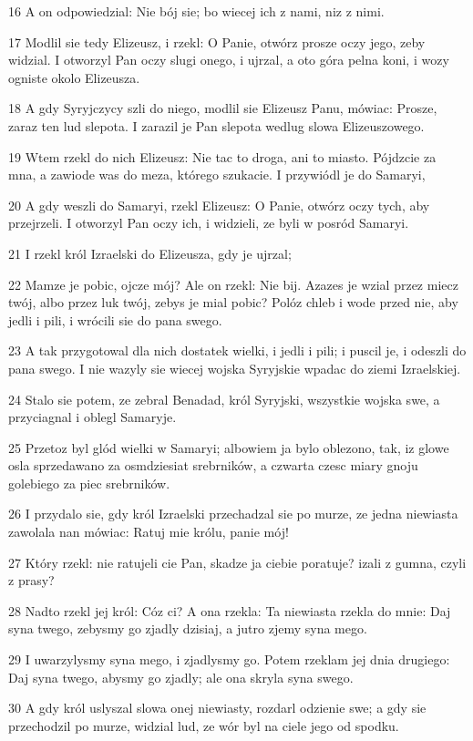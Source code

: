\par 16 A on odpowiedzial: Nie bój sie; bo wiecej ich z nami, niz z nimi.
\par 17 Modlil sie tedy Elizeusz, i rzekl: O Panie, otwórz prosze oczy jego, zeby widzial. I otworzyl Pan oczy slugi onego, i ujrzal, a oto góra pelna koni, i wozy ogniste okolo Elizeusza.
\par 18 A gdy Syryjczycy szli do niego, modlil sie Elizeusz Panu, mówiac: Prosze, zaraz ten lud slepota. I zarazil je Pan slepota wedlug slowa Elizeuszowego.
\par 19 Wtem rzekl do nich Elizeusz: Nie tac to droga, ani to miasto. Pójdzcie za mna, a zawiode was do meza, którego szukacie. I przywiódl je do Samaryi,
\par 20 A gdy weszli do Samaryi, rzekl Elizeusz: O Panie, otwórz oczy tych, aby przejrzeli. I otworzyl Pan oczy ich, i widzieli, ze byli w posród Samaryi.
\par 21 I rzekl król Izraelski do Elizeusza, gdy je ujrzal;
\par 22 Mamze je pobic, ojcze mój? Ale on rzekl: Nie bij. Azazes je wzial przez miecz twój, albo przez luk twój, zebys je mial pobic? Polóz chleb i wode przed nie, aby jedli i pili, i wrócili sie do pana swego.
\par 23 A tak przygotowal dla nich dostatek wielki, i jedli i pili; i puscil je, i odeszli do pana swego. I nie wazyly sie wiecej wojska Syryjskie wpadac do ziemi Izraelskiej.
\par 24 Stalo sie potem, ze zebral Benadad, król Syryjski, wszystkie wojska swe, a przyciagnal i oblegl Samaryje.
\par 25 Przetoz byl glód wielki w Samaryi; albowiem ja bylo oblezono, tak, iz glowe osla sprzedawano za osmdziesiat srebrników, a czwarta czesc miary gnoju golebiego za piec srebrników.
\par 26 I przydalo sie, gdy król Izraelski przechadzal sie po murze, ze jedna niewiasta zawolala nan mówiac: Ratuj mie królu, panie mój!
\par 27 Który rzekl: nie ratujeli cie Pan, skadze ja ciebie poratuje? izali z gumna, czyli z prasy?
\par 28 Nadto rzekl jej król: Cóz ci? A ona rzekla: Ta niewiasta rzekla do mnie: Daj syna twego, zebysmy go zjadly dzisiaj, a jutro zjemy syna mego.
\par 29 I uwarzylysmy syna mego, i zjadlysmy go. Potem rzeklam jej dnia drugiego: Daj syna twego, abysmy go zjadly; ale ona skryla syna swego.
\par 30 A gdy król uslyszal slowa onej niewiasty, rozdarl odzienie swe; a gdy sie przechodzil po murze, widzial lud, ze wór byl na ciele jego od spodku.
